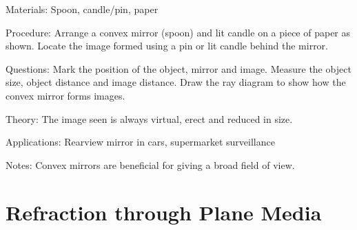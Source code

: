 \begin{multicols}{2}
\begin{description*}
\item[Materials:]{Spoon, candle/pin, paper}
\item[Procedure:]{Arrange a convex mirror (spoon) and lit candle on a piece of paper as shown. Locate the image formed using a pin or lit candle behind the mirror.}
\item[Questions:]{Mark the position of the object, mirror and image. Measure the object size, object distance and image distance. Draw the ray diagram to show how the convex mirror forms images.}
\item[Theory:]{The image seen is always virtual, erect and reduced in size.}
\item[Applications:]{Rearview mirror in cars, supermarket surveillance}
\item[Notes:]{Convex mirrors are beneficial for giving a broad field of view.}
\end{description*}

%
%


\section*{Refraction through Plane Media}



\end{multicols}
